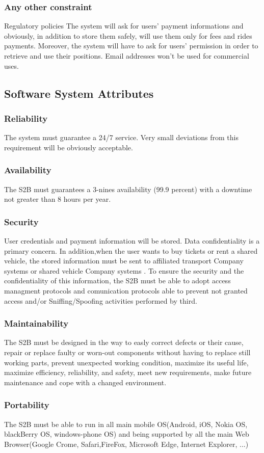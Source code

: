 	\subsubsection{Any other constraint}
	Regulatory policies
	The system will ask for users' payment informations and obviously, in addition to store them
	safely, will use them only for fees and rides payments.
	Moreover, the system will have to ask for users' permission in order to retrieve and use their
	positions.
	Email addresses won't be used for commercial uses.
\subsection{Software System Attributes} 
	\subsubsection{Reliability}
	The system must guarantee a 24/7 service. Very small deviations from this requirement will be
	obviously acceptable.
	\subsubsection{Availability}
	The S2B must guarantees a 3-nines availability (99.9 percent) with a downtime not greater than 8 hours per year.
	\subsubsection{Security}
User credentials and payment information will be stored. Data confidentiality is a primary concern.
In addition,when the user wants to buy tickets or rent a shared vehicle, the stored information must be sent to affiliated  transport Company systems or shared vehicle Company  systems . To ensure the security and the confidentiality of this information, the S2B must be able to adopt  access managment protocols and comunication protocols able to prevent not granted access and/or Sniffing/Spoofing activities performed by third.
	
	\subsubsection{Maintainability}
	The S2B must be designed in the way to easly correct defects or their cause,
	repair or replace faulty or worn-out components without having to replace still working parts,
	prevent unexpected working condition,
	maximize its useful life,
	maximize efficiency, reliability, and safety,
	meet new requirements,
	make future maintenance and
	cope with a changed environment.
	
	\subsubsection{Portability}
	The S2B must be able to run in all main mobile OS(Android, iOS, Nokia OS, blackBerry OS, windows-phone OS) and being supported by all the main Web Browser(Google Crome, Safari,FireFox, Microsoft Edge, Internet Explorer, ...)\newline
	
